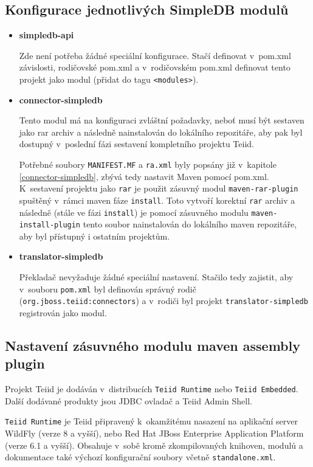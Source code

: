 \documentclass[oneside,12pt]{fithesis2}
\begin{document}
\subsection{Konfigurace jednotlivých SimpleDB modulů}
\label{konfigurace}
\begin{itemize}
 \item \textbf{simpledb-api}
 
 Zde není potřeba žádné speciální konfigurace. Stačí definovat v~pom.xml závislosti, rodičovské pom.xml a v~rodičovském pom.xml definovat tento projekt jako modul (přidat do tagu \texttt{<modules>}).
 \item \textbf{connector-simpledb}
 
 Tento modul má na konfiguraci zvláštní požadavky, neboť musí být sestaven jako rar archiv a následně nainstalován do lokálního repozitáře, aby pak byl dostupný v~poslední fázi sestavení kompletního projektu Teiid.
 
 Potřebné soubory \texttt{MANIFEST.MF} a \texttt{ra.xml} byly popsány již v~kapitole \ref{connector-simpledb}, zbývá tedy nastavit Maven pomocí pom.xml.
 K~sestavení projektu jako \texttt{rar} je použit zásuvný modul \texttt{maven-rar-plugin} spuštěný v~rámci maven fáze \texttt{install}. Toto vytvoří korektní \texttt{rar} archiv a následně (stále ve fázi \texttt{install}) je pomocí zásuvného modulu \texttt{maven-install-plugin} tento soubor nainstalován do lokálního maven repozitáře, aby byl přístupný i ostatním projektům.
 
 \item \textbf{translator-simpledb}
 
 Překladač nevyžaduje žádné speciální nastavení. Stačilo tedy zajistit, aby v~souboru \texttt{pom.xml} byl definován správný rodič (\texttt{org.jboss.teiid:connectors}) a v~rodiči byl projekt \texttt{translator\allowbreak -simpledb} registrován jako modul.
\end{itemize}

\subsection{Nastavení zásuvného modulu maven assembly plugin}
Projekt Teiid je dodáván v~distribucích \texttt{Teiid Runtime} nebo \texttt{Teiid Embedded}. Další dodávané produkty jsou JDBC ovladač a Teiid Admin Shell. 

\texttt{Teiid Runtime} je Teiid připravený k~okamžitému nasazení na aplikační server WildFly (verze 8 a vyšší), nebo Red Hat JBoss Enterprise Application Platform (verze 6.1 a vyšší). Obsahuje v~sobě kromě zkompilovaných knihoven, modulů a dokumentace také výchozí konfigurační soubory včetně \texttt{standalone.xml}.
\end{document}
